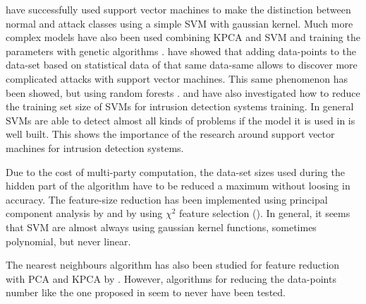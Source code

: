 \cite{Mukkamala2002IntrusionMachines} have successfully used support vector machines to make the distinction between normal and attack classes using a simple SVM with gaussian kernel. Much more complex models have also been used combining KPCA and SVM and training the parameters with genetic algorithms \cite{Kuang2014ADetection}. \cite{MingTian2004UsingAttacks} have showed that adding data-points to the data-set based on statistical data of that same data-same allows to discover more complicated attacks with support vector machines. This same phenomenon has been showed, but using random forests \cite{Akashdeep2017AClassifier}. \cite{Khan2007AClustering} and \cite{Al-Yaseen2017Multi-levelSystem} have also investigated how to reduce the training set size of SVMs for intrusion detection systems training. In general SVMs are able to detect almost all kinds of problems if the model it is used in is well built. This shows the importance of the research around support vector machines for intrusion detection systems. 

Due to the cost of multi-party computation, the data-set sizes used during the hidden part of the algorithm have to be reduced a maximum without loosing in accuracy. The feature-size reduction has been implemented using principal component analysis by \cite{Eid2010PrincipleSystem,Ikram2016ImprovingSVM} and by \cite{SumaiyaThaseen2017IntrusionSVM} using $\chi^2$ feature selection (\cite{Yang:1997:CSF:645526.657137}). In general, it seems that SVM are almost always using gaussian kernel functions, sometimes polynomial, but never linear.

The nearest neighbours algorithm has also been studied for feature reduction with PCA and KPCA by \cite{Elkhadir2016IntrusionMethods}. However, algorithms for reducing the data-points number like the one proposed in \cite{Angiulli2005FastRule} seem to never have been tested.








